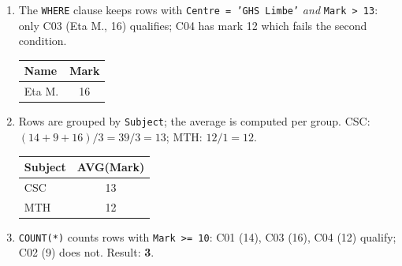 \documentclass[11pt]{article}
\begin{document}
\begin{corrige}
\begin{enumerate}
\item The \texttt{WHERE} clause keeps rows with \texttt{Centre = 'GHS Limbe'} \emph{and} \texttt{Mark > 13}: only C03 (Eta M., 16) qualifies; C04 has mark 12 which fails the second condition.
\begin{center}
\begin{tabular}{|l|c|}
\hline
\rowcolor{popblueL} \textbf{Name} & \textbf{Mark} \\
\hline
Eta M. & 16 \\
\hline
\end{tabular}
\end{center}
\item Rows are grouped by \texttt{Subject}; the average is computed per group. CSC: $(14+9+16)/3 = 39/3 = 13$; MTH: $12/1 = 12$.
\begin{center}
\begin{tabular}{|l|c|}
\hline
\rowcolor{popblueL} \textbf{Subject} & \textbf{AVG(Mark)} \\
\hline
CSC & 13 \\
\hline
MTH & 12 \\
\hline
\end{tabular}
\end{center}
\item \texttt{COUNT(*)} counts rows with \texttt{Mark >= 10}: C01 (14), C03 (16), C04 (12) qualify; C02 (9) does not. Result: \textbf{3}.
\end{enumerate}
\end{corrige}
\end{document}
